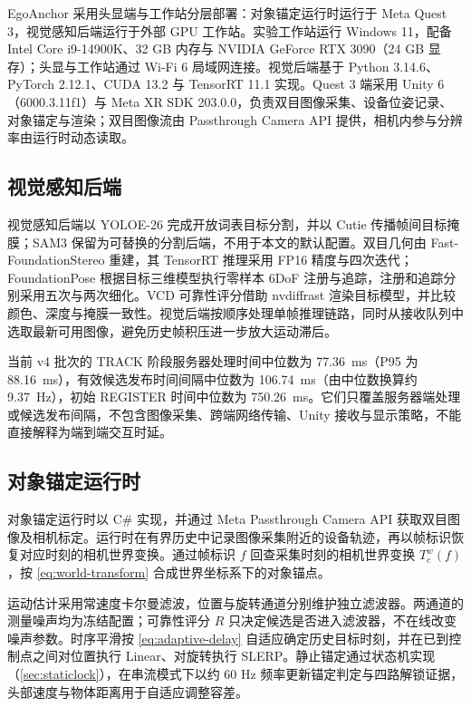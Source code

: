 \documentclass[review]{vgtc}
\begin{document}
EgoAnchor 采用头显端与工作站分层部署：对象锚定运行时运行于 Meta Quest 3，视觉感知后端运行于外部 GPU 工作站。实验工作站运行 Windows 11，配备 Intel Core i9-14900K、32 GB 内存与 NVIDIA GeForce RTX 3090（24 GB 显存）；头显与工作站通过 Wi-Fi 6 局域网连接。视觉后端基于 Python 3.14.6、PyTorch 2.12.1、CUDA 13.2 与 TensorRT 11.1 实现。Quest 3 端采用 Unity 6（6000.3.11f1）与 Meta XR SDK 203.0.0，负责双目图像采集、设备位姿记录、对象锚定与渲染；双目图像流由 Passthrough Camera API 提供，相机内参与分辨率由运行时动态读取。

\subsection{视觉感知后端}


视觉感知后端以 YOLOE-26 完成开放词表目标分割，并以 Cutie 传播帧间目标掩膜；SAM3 保留为可替换的分割后端，不用于本文的默认配置。双目几何由 Fast-FoundationStereo 重建，其 TensorRT 推理采用 FP16 精度与四次迭代；FoundationPose 根据目标三维模型执行零样本 6DoF 注册与追踪，注册和追踪分别采用五次与两次细化。VCD 可靠性评分借助 nvdiffrast 渲染目标模型，并比较颜色、深度与掩膜一致性。视觉后端按顺序处理单帧推理链路，同时从接收队列中选取最新可用图像，避免历史帧积压进一步放大运动滞后。

当前 v4 批次的 TRACK 阶段服务器处理时间中位数为 77.36~ms（P95 为 88.16~ms），有效候选发布时间间隔中位数为 106.74~ms（由中位数换算约 9.37~Hz），初始 REGISTER 时间中位数为 750.26~ms。它们只覆盖服务器端处理或候选发布间隔，不包含图像采集、跨端网络传输、Unity 接收与显示策略，不能直接解释为端到端交互时延。

\subsection{对象锚定运行时}


对象锚定运行时以 C\# 实现，并通过 Meta Passthrough Camera API 获取双目图像及相机标定。运行时在有界历史中记录图像采集附近的设备轨迹，再以帧标识恢复对应时刻的相机世界变换。通过帧标识 $f$ 回查采集时刻的相机世界变换 $T_c^w (f)$，按 \ref{eq:world-transform} 合成世界坐标系下的对象锚点。

运动估计采用常速度卡尔曼滤波，位置与旋转通道分别维护独立滤波器。两通道的测量噪声均为冻结配置；可靠性评分 $R$ 只决定候选是否进入滤波器，不在线改变噪声参数。时序平滑按 \ref{eq:adaptive-delay} 自适应确定历史目标时刻，并在已到控制点之间对位置执行 Linear、对旋转执行 SLERP。静止锚定通过状态机实现（\ref{sec:staticlock}），在串流模式下以约 60 Hz 频率更新锚定判定与四路解锁证据，头部速度与物体距离用于自适应调整容差。
\end{document}
